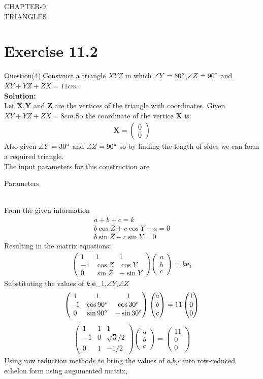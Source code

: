 \documentclass[10pt]{article}
\newcommand{\myvec}[1]{\ensuremath{\begin{pmatrix}#1\end{pmatrix}}}
\let\vec\mathbf{}
\begin{document}
\begin{center}
        \textbf\large{CHAPTER-9 \\ TRIANGLES}
\end{center}
\section{Exercise 11.2}
Question(4).Construct a triangle $XYZ$ in which $\angle{Y}=30\degree$,$\angle{Z}=90\degree$ and $XY+YZ+ZX=11cm$. \\
\textbf{Solution:}\\
Let $\vec{X}$,$\vec{Y}$ and $\vec{Z}$ are the vertices of the triangle with coordinates.
Given $XY+YZ+ZX=8cm$.So the coordinate of the vertice  $\vec{X}$ is:
\begin{align}
{
\vec{X} =\myvec{0\\0}
}
\end{align}
Also given $\angle{Y}=30\degree$ and $\angle{Z}=90\degree$ so by finding the length of sides we can form a required triangle. \\
 The input parameters for this construction are\\
 \begin{table}[h]
	 \centering
	 
	 \caption{Parameters}
	 \label{tab:table1}
 \end{table}\\
From the given information\\
 \begin{align}
     a+b+c=k\\
	 b\cos{Z}+c\cos{Y}-a=0\\
	 b\sin{Z}-c\sin{Y}=0
 \end{align}
 Resulting in the matrix equations:
 \begin{align}
	 \myvec{1 & 1 & 1\\-1 & \cos{Z} & \cos{Y}\\0 & \sin{Z} & -\sin{Y}}\myvec{a \\ b \\ c}=k\vec{e}_1
 \end{align}
 Substituting the values of $k$,$\vec{e}$_1,$\angle{Y}$,$\angle{Z}$
 \begin{align}
     \myvec{1 & 1 & 1\\-1 & \cos{90\degree} & \cos{30\degree}\\ 0 & \sin{90\degree} & -\sin{30\degree}}\myvec{a \\ b \\ c}= 11\myvec{1 \\ 0 \\ 0 }
 \end{align}
  \begin{align}
	  \myvec{1 & 1 & 1\\-1 & 0 & \sqrt{3}/2\\0 &  1 & -1/2}\myvec{a \\ b \\c}= \myvec{11 \\ 0 \\ 0 }
  \end{align}
 Using row reduction methods to bring the values of $a$,$b$,$c$ into row-reduced echelon form using augumented matrix,
\end{document}
